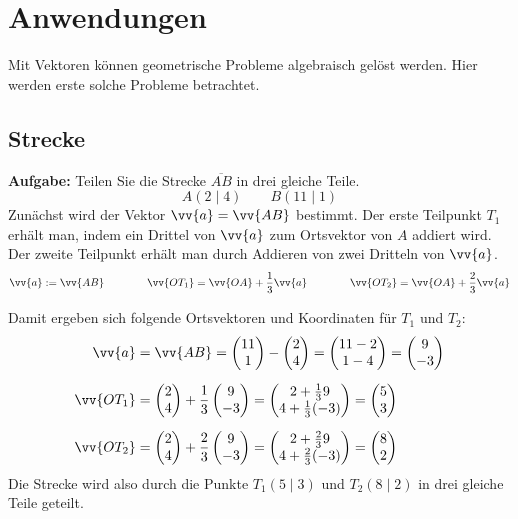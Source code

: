 \newpage
\section{Anwendungen}

Mit Vektoren können geometrische Probleme algebraisch gelöst werden. Hier werden erste solche Probleme betrachtet.

\subsection{Strecke}
\textbf{Aufgabe:} Teilen Sie die Strecke $\overline{AB}$ in drei gleiche Teile.
\[
  A(2\mid 4) \qquad B(11\mid 1)
\]
Zunächst wird der Vektor $\vv{a} = \vv{AB}$ bestimmt. Der erste Teilpunkt $T_{1}$ erhält man, indem ein Drittel von $\vv{a}$ zum Ortsvektor von $A$ addiert wird. Der zweite Teilpunkt erhält man durch Addieren von zwei Dritteln von $\vv{a}$.
\[
  \vv{a} := \vv{AB} \qquad\qquad \vv{OT_{1}} = \vv{OA} + \frac{1}{3}\vv{a} \qquad\qquad \vv{OT_{2}} = \vv{OA} + \frac{2}{3}\vv{a}
\]

\begin{center}
\end{center}
Damit ergeben sich folgende Ortsvektoren und Koordinaten für $T_{1}$ und $T_{2}$:
\begin{align*}
       \vv{a} &= \vv{AB} = \vxy{11}{1} - \vxy{2}{4} = \vxy{11-2}{1-4} = \vxy{9}{-3} \\[2mm]
  \vv{OT_{1}} &= \vxy{2}{4}+\frac{1}{3}\vxy{9}{-3} = \vxy{2+\frac{1}{3}9}{4+\frac{1}{3}(-3)} = \vxy{5}{3} \\[2mm]
  \vv{OT_{2}} &= \vxy{2}{4}+\frac{2}{3}\vxy{9}{-3} = \vxy{2+\frac{2}{3}9}{4+\frac{2}{3}(-3)} = \vxy{8}{2}
\end{align*}
Die Strecke wird also durch die Punkte $T_{1}(5\mid 3)$ und $T_{2}(8\mid 2)$ in drei gleiche Teile geteilt.


